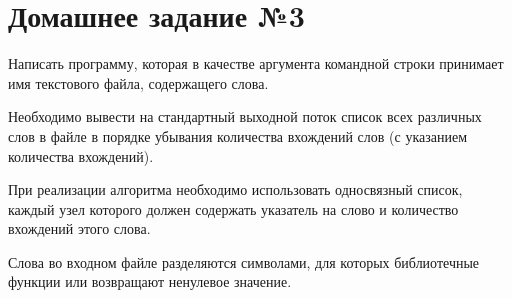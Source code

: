 \section*{Домашнее задание №3}


Написать программу, которая в качестве аргумента командной строки
принимает имя текстового файла, содержащего слова.

Необходимо
вывести на стандартный выходной поток список всех различных слов в
файле в порядке убывания количества вхождений слов (с указанием
количества вхождений).

При реализации алгоритма необходимо
использовать односвязный список, каждый узел которого должен
содержать указатель на слово и количество вхождений этого слова.

Слова
во входном файле разделяются символами, для которых библиотечные
функции  или  возвращают ненулевое значение.
